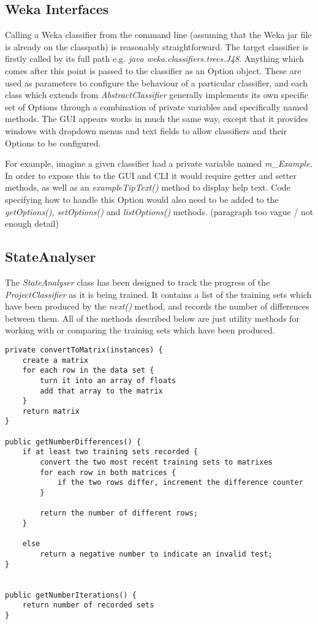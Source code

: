\subsection{Weka Interfaces}
Calling a Weka classifier from the command line (assuming that the Weka jar file is already on the classpath) is reasonably straightforward. The target classifier is firstly called by its full path e.g.  \textit{java weka.classifiers.trees.J48}. Anything which comes after this point is passed to the classifier as an Option object. These are used as parameters to configure the behaviour of a particular classifier, and each class which extends from \textit{AbstractClassifier} generally implements its own specific set of Options through a combination of private variables and specifically named methods. The GUI appears works in much the same way, except that it provides windows with dropdown menus and text fields to allow classifiers and their Options to be configured.  

For example, imagine a given classifier had a private variable named \textit{m\_Example}. In order to expose this to the GUI and CLI it would require getter and setter methods, as well as an \textit{exampleTipText()} method to display help text. Code specifying how to handle this Option would also need to be added to the \textit{getOptions()}, \textit{setOptions()} and \textit{listOptions()} methods. (paragraph too vague / not enough detail)

\subsection{StateAnalyser}
The \textit{StateAnalyser} class has been designed to track the progress of the \textit{ProjectClassifier} as it is being trained. It contains a list of the training sets which have been produced by the \textit{next()} method, and records the number of differences between them. All of the methods described below are just utility methods for working with or comparing the training sets which have been produced.

\begin{footnotesize}
\begin{verbatim}
private convertToMatrix(instances) {
    create a matrix
    for each row in the data set {
        turn it into an array of floats
        add that array to the matrix
    }
    return matrix
}

public getNumberDifferences() {
    if at least two training sets recorded {
        convert the two most recent training sets to matrixes
        for each row in both matrices {
            if the two rows differ, increment the difference counter
        }

        return the number of different rows;
    }

    else
        return a negative number to indicate an invalid test;
}


public getNumberIterations() {
    return number of recorded sets
}
\end{verbatim}
\end{footnotesize}
